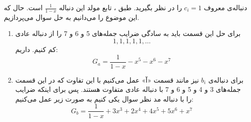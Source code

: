     \p
    دنباله‌ی معروف 
    $c_i = 1$
    را در نظر بگیرید. طبق
    ، تابع مولد این دنباله
    $\frac{1}{1-x}$
    است.
حال که این موضوع را می‌دانیم به حل سوال می‌پردازیم.
\begin{enumerate}
    \item 
            برای حل این قسمت باید به سادگی ضرایب جمله‌های 5 و 6 و 7 را از دنباله عادی
            $${1,1,1,1,1,\ldots}$$
            کم کنیم. داریم:
            $$G_{a} = \frac{1}{1-x} - x^5 - x^6 - x^7$$
    \item
            برای دنباله‌ی 
            $b_i$
              نیز مانند قسمت «آ» عمل می‌کنیم با این تفاوت که در این قسمت جمله‌های 3 و 4 و 5 و 6 و 7 با دنباله عادی متفاوت هستند. پس برای اینکه ضرایب را با دنباله مد نظر سوال یکی کنیم به صورت زیر عمل می‌کنیم:
            $$G_{b} = \frac{1}{1-x} + 3x^3 + 2x^4 + 4x^5 + 5x^6 + x^7$$
      
\end{enumerate}